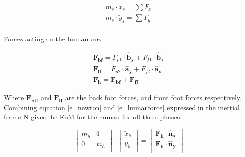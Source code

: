 \documentclass[default,iicol]{sn-jnl}
\begin{document}
\begin{equation}\label{e_newton}
\begin{array}{c}
        m_s \cdot \ddot x_s = \sum F_x  \\
        m_s \cdot \ddot y_s = \sum F_y  \\
    \end{array}
\end{equation}

\noindent Forces acting on the human are:

\begin{equation} \label{e_humanforce}
\begin{array}{cc}
      \mathbf{F_{bf}} = F_{p1} \cdot \mathbf{\hat b_y} + F_{f1} \cdot \mathbf{\hat b_x}\\
      \mathbf{F_{ff}} = F_{p2} \cdot \mathbf{\hat a_y} + F_{f2} \cdot \mathbf{\hat a_x}\\
      \mathbf{F_h}    = \mathbf{F_{bf}} + \mathbf{F_{ff}}
\end{array}
\end{equation}

\noindent Where $\mathbf{F_{bf}}$, and  $\mathbf{F_{ff}}$ are the back foot forces, and front foot forces respectively. Combining equation \ref{e_newton} and \ref{e_humanforce} expressed in the inertial frame N gives the EoM for the human for all three phases:

\begin{equation} \label{e_humaneom}
    \left[\begin{array}{cc}
        m_h & 0 \\
        0 & m_h \\
    \end{array}\right] \cdot \left[\begin{array}{c}
         \ddot x_h  \\
         \ddot y_h \\
    \end{array}\right]=\left[\begin{array}{c}
        \mathbf{F_h}\cdot \mathbf{\hat n_x}  \\
        \mathbf{F_h}\cdot \mathbf{\hat n_y}\\
    \end{array}\right]
\end{equation}
\end{document}
